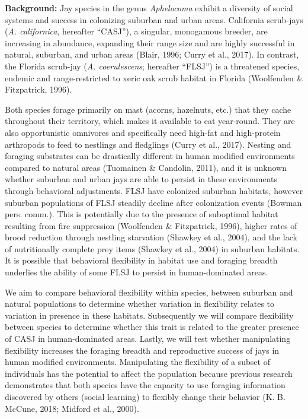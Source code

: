 \documentclass[
]{article}
\begin{document}
\textbf{Background:} Jay species in the genus \emph{Aphelocoma} exhibit
a diversity of social systems and success in colonizing suburban and
urban areas. California scrub-jays (\emph{A. californica}, hereafter
``CASJ''), a singular, monogamous breeder, are increasing in abundance,
expanding their range size and are highly successful in natural,
suburban, and urban areas (Blair, 1996; Curry et al., 2017). In
contrast, the Florida scrub-jay (\emph{A. coerulescens}; hereafter
``FLSJ'') is a threatened species, endemic and range-restricted to xeric
oak scrub habitat in Florida (Woolfenden \& Fitzpatrick, 1996).

Both species forage primarily on mast (acorns, hazelnuts, etc.) that
they cache throughout their territory, which makes it available to eat
year-round. They are also opportunistic omnivores and specifically need
high-fat and high-protein arthropods to feed to nestlings and fledglings
(Curry et al., 2017). Nesting and foraging substrates can be drastically
different in human modified environments compared to natural areas
(Tuomainen \& Candolin, 2011), and it is unknown whether suburban and
urban jays are able to persist in these environments through behavioral
adjustments. FLSJ have colonized suburban habitats, however suburban
populations of FLSJ steadily decline after colonization events (Bowman
pers. comm.). This is potentially due to the presence of suboptimal
habitat resulting from fire suppression (Woolfenden \& Fitzpatrick,
1996), higher rates of brood reduction through nestling starvation
(Shawkey et al., 2004), and the lack of nutritionally complete prey
items (Shawkey et al., 2004) in suburban habitats. It is possible that
behavioral flexibility in habitat use and foraging breadth underlies the
ability of some FLSJ to persist in human-dominated areas.

We aim to compare behavioral flexibility within species, between
suburban and natural populations to determine whether variation in
flexibility relates to variation in presence in these habitats.
Subsequently we will compare flexibility between species to determine
whether this trait is related to the greater presence of CASJ in
human-dominated areas. Lastly, we will test whether manipulating
flexibility increases the foraging breadth and reproductive success of
jays in human modified environments. Manipulating the flexibility of a
subset of individuals has the potential to affect the population because
previous research demonstrates that both species have the capacity to
use foraging information discovered by others (social learning) to
flexibly change their behavior (K. B. McCune, 2018; Midford et al.,
2000).
\end{document}
